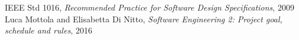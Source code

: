 	IEEE Std 1016, \emph{Recommended Practice for Software Design Specifications}, 2009
	Luca Mottola and Elisabetta Di Nitto, \emph{Software Engineering 2: Project goal, schedule and rules}, 2016
	